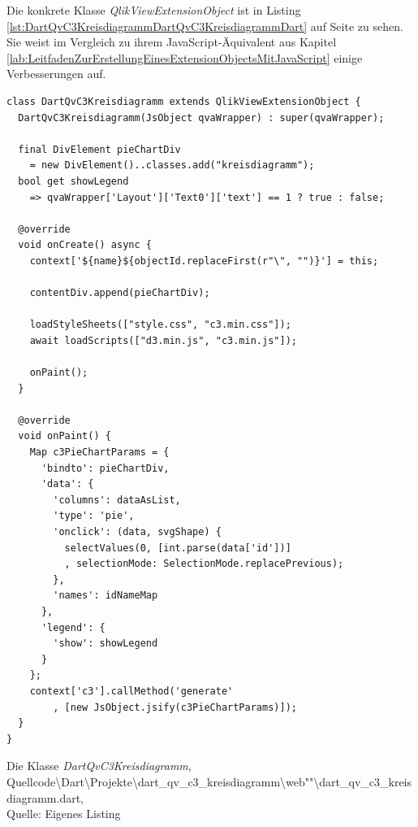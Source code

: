 Die konkrete Klasse \textit{QlikViewExtensionObject} ist in Listing \ref{lst:DartQvC3KreisdiagrammDartQvC3KreisdiagrammDart} auf Seite \pageref{lst:DartQvC3KreisdiagrammDartQvC3KreisdiagrammDart} zu sehen. Sie weist im Vergleich zu ihrem JavaScript-Äquivalent aus Kapitel \ref{lab:LeitfadenZurErstellungEinesExtensionObjectsMitJavaScript} einige Verbesserungen auf.


\begin{listing}[htbp]
\begin{verbatim}
class DartQvC3Kreisdiagramm extends QlikViewExtensionObject {
  DartQvC3Kreisdiagramm(JsObject qvaWrapper) : super(qvaWrapper);

  final DivElement pieChartDiv 
    = new DivElement()..classes.add("kreisdiagramm");
  bool get showLegend
    => qvaWrapper['Layout']['Text0']['text'] == 1 ? true : false;
  
  @override
  void onCreate() async {
    context['${name}${objectId.replaceFirst(r"\", "")}'] = this;
    
    contentDiv.append(pieChartDiv);

    loadStyleSheets(["style.css", "c3.min.css"]);
    await loadScripts(["d3.min.js", "c3.min.js"]);

    onPaint();
  }

  @override
  void onPaint() {
    Map c3PieChartParams = {
      'bindto': pieChartDiv,
      'data': {
        'columns': dataAsList,
        'type': 'pie',
        'onclick': (data, svgShape) {
          selectValues(0, [int.parse(data['id'])]
          , selectionMode: SelectionMode.replacePrevious);
        },
        'names': idNameMap
      },
      'legend': {
        'show': showLegend
      }
    };
    context['c3'].callMethod('generate'
        , [new JsObject.jsify(c3PieChartParams)]);
  }  
}
\end{verbatim}
\caption[Die Klasse \textit{DartQvC3Kreisdiagramm}]{Die Klasse \textit{DartQvC3Kreisdiagramm}, \\Quellcode\textbackslash{}Dart\textbackslash{}Projekte\textbackslash{}dart\_qv\_c3\_kreisdiagramm\textbackslash{}web""\textbackslash{}dart\_qv\_c3\_kreisdiagramm.dart, \\Quelle: Eigenes Listing}
\label{lst:DartQvC3KreisdiagrammDartQvC3KreisdiagrammDart}
\end{listing}


